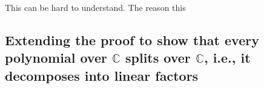 \documentclass[12pt]{article}
\begin{document}
This can be hard to understand.  The reason this 






\subsection*{Extending the proof to show that every polynomial over $\mathbb{C}$ splits over $\mathbb{C}$, i.e., it decomposes into linear factors}
\end{document}
